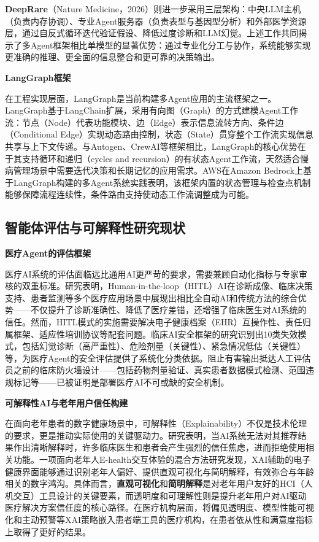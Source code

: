 \textbf{DeepRare}（Nature Medicine，2026）则进一步采用三层架构：中央LLM主机（负责内存协调）、专业Agent服务器（负责表型与基因型分析）和外部医学资源层，通过自反式循环迭代验证假设、降低过度诊断和LLM幻觉。上述工作共同揭示了多Agent框架相比单模型的显著优势：通过专业化分工与协作，系统能够实现更准确的推理、更全面的信息整合和更可靠的决策输出\todocite{}。

\noindent\textbf{LangGraph框架}

在工程实现层面，LangGraph是当前构建多Agent应用的主流框架之一。LangGraph基于LangChain扩展，采用有向图（Graph）的方式建模Agent工作流：节点（Node）代表功能模块、边（Edge）表示信息流转方向、条件边（Conditional Edge）实现动态路由控制，状态（State）贯穿整个工作流实现信息共享与上下文传递。与Autogen、CrewAI等框架相比，LangGraph的核心优势在于其支持循环和递归（cycles and recursion）的有状态Agent工作流，天然适合慢病管理场景中需要迭代决策和长期记忆的应用需求。AWS在Amazon Bedrock上基于LangGraph构建的多Agent系统实践表明，该框架内置的状态管理与检查点机制能够保障流程连续性，条件路由支持使动态工作流调整成为可能\todocite{}\todocite{}\todocite{}\todocite{}。

\subsection{智能体评估与可解释性研究现状}

\noindent\textbf{医疗Agent的评估框架}

医疗AI系统的评估面临远比通用AI更严苛的要求，需要兼顾自动化指标与专家审核的双重标准。研究表明，Human-in-the-loop（HITL）AI在诊断成像、临床决策支持、患者监测等多个医疗应用场景中展现出相比全自动AI和传统方法的综合优势------不仅提升了诊断准确性、降低了医疗差错，还增强了临床医生对AI系统的信任。然而，HITL模式的实施需要解决电子健康档案（EHR）互操作性、责任归属框架、适应性培训协议等配套问题。临床AI安全框架的研究识别出10类失效模式，包括幻觉诊断（高严重性）、危险剂量（关键性）、紧急情况低估（关键性）等，为医疗Agent的安全评估提供了系统化分类依据。阻止有害输出抵达人工评估员之前的临床防火墙设计------包括药物剂量验证、真实患者数据模式检测、范围违规标记等------已被证明是部署医疗AI不可或缺的安全机制\todocite{}\todocite{}。

\noindent\textbf{可解释性AI与老年用户信任构建}

在面向老年患者的数字健康场景中，可解释性（Explainability）不仅是技术伦理的要求，更是推动实际使用的关键驱动力。研究表明，当AI系统无法对其推荐结果作出清晰解释时，许多临床医生和患者会产生强烈的信任焦虑，进而拒绝使用相关功能。一项面向老年人E-health交互体验的混合方法研究发现，XAI辅助的电子健康界面能够通过识别老年人偏好、提供直观可视化与简明解释，有效弥合与年龄相关的数字鸿沟。具体而言，\textbf{直观可视化}和\textbf{简明解释}是对老年用户友好的HCI（人机交互）工具设计的关键要素，而透明度和可理解性则是提升老年用户对AI驱动医疗解决方案信任度的核心路径。在医疗机构层面，将偏见透明度、模型性能可视化和主动预警等XAI策略嵌入患者端工具的医疗机构，在患者依从性和满意度指标上取得了更好的结果\todocite{}\todocite{}\todocite{}。

